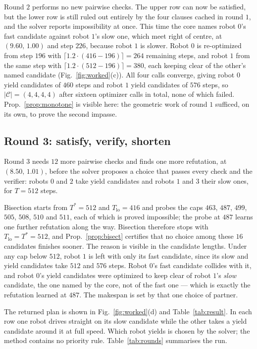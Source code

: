 \documentclass[conference]{IEEEtran}
\theoremstyle{plain}
\theoremstyle{definition}
\newcommand{\Cand}{\mathcal{C}}
\begin{document}
Round $2$ performs no new pairwise checks. The upper row can now be satisfied, but the lower
row is still ruled out entirely by the four clauses cached in round $1$, and the solver reports
impossibility at once. This time the core names robot $0$'s fast candidate against robot $1$'s
slow one, which meet right of centre, at $(9.60,\,1.00)$ and step $226$, because robot $1$ is
slower. Robot $0$ is re-optimized from step $196$ with $\lceil 1.2 \cdot (416 - 196)\rceil = 264$
remaining steps, and robot $1$ from the same step with $\lceil 1.2 \cdot (512-196) \rceil = 380$,
each keeping clear of the other's named candidate (Fig.~\ref{fig:worked}(c)). All four calls
converge, giving robot $0$ yield candidates of $460$ steps and robot $1$ yield candidates of
$576$ steps, so $|\Cand| = (4,4,4,4)$ after sixteen optimizer calls in total, none of which
failed. Prop.~\ref{prop:monotone} is visible here: the geometric work of round $1$ sufficed, on
its own, to prove the second impasse.

\subsection{Round 3: satisfy, verify, shorten}

Round $3$ needs $12$ more pairwise checks and finds one more refutation, at
$(8.50,\,1.01)$, before the solver proposes a choice that passes every check and the verifier:
robots $0$ and $2$ take yield candidates and robots $1$ and $3$ their slow ones, for $T = 512$
steps.

Bisection starts from $T^\ast = 512$ and $T_{\text{lo}} = 416$ and probes the caps $463$, $487$,
$499$, $505$, $508$, $510$ and $511$, each of which is proved impossible; the probe at $487$
learns one further refutation along the way. Bisection therefore stops with
$T_{\text{lo}} = T^\ast = 512$, and Prop.~\ref{prop:bisect} certifies that no choice among these
$16$ candidates finishes sooner. The reason is visible in the candidate lengths. Under any cap
below $512$, robot $1$ is left with only its fast candidate, since its slow and yield candidates
take $512$ and $576$ steps. Robot $0$'s fast candidate collides with it, and robot $0$'s yield
candidates were optimized to keep clear of robot $1$'s \emph{slow} candidate, the one named by
the core, not of the fast one --- which is exactly the refutation learned at $487$. The
makespan is set by that one choice of partner.

The returned plan is shown in Fig.~\ref{fig:worked}(d) and Table~\ref{tab:result}. In each row
one robot drives straight on its slow candidate while the other takes a yield candidate around
it at full speed. Which robot yields is chosen by the solver; the method contains no priority
rule. Table~\ref{tab:rounds} summarises the run.
\end{document}
